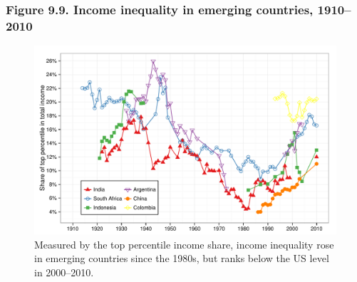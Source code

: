 \documentclass[t]{beamer}\usepackage[]{graphicx}\usepackage[]{color}
\newenvironment{knitrout}{}{} %
\begin{document}
\begin{frame}[label=Figure_9_9]
\frametitle{Figure 9.9. Income inequality in emerging countries, 1910--2010}
\begin{figure}[t]
\begin{minipage}[b]{\textwidth}
\centering
\begin{knitrout}\footnotesize
{}\color{fgcolor}

{\centering \includegraphics[width=1\linewidth]{figures/color/Figure_9_9} 

}



\end{knitrout}
\caption{Measured by the top percentile income share, income inequality rose in emerging countries since the 1980s, but ranks below the US level in 2000--2010.}
\end{minipage}
\end{figure}
\end{frame}
\end{document}
